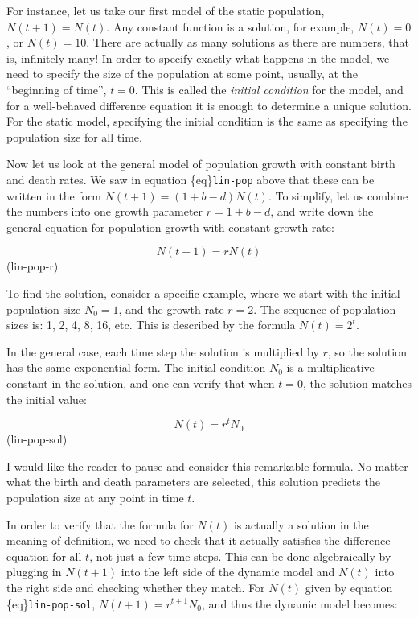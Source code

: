 \documentclass[
  letterpaper,
  DIV=11,
  numbers=noendperiod]{scrreprt}
\begin{document}
For instance, let us take our first model of the static population,
\(N(t+1) = N(t)\). Any constant function is a solution, for example,
\(N(t) = 0\), or \(N(t) = 10\). There are actually as many solutions as
there are numbers, that is, infinitely many! In order to specify exactly
what happens in the model, we need to specify the size of the population
at some point, usually, at the ``beginning of time'', \(t = 0\). This is
called the \emph{initial condition} for the model, and for a
well-behaved difference equation it is enough to determine a unique
solution. For the static model, specifying the initial condition is the
same as specifying the population size for all time.

Now let us look at the general model of population growth with constant
birth and death rates. We saw in equation \{eq\}\texttt{lin-pop} above
that these can be written in the form \(N(t+1) = (1 + b - d) N(t)\). To
simplify, let us combine the numbers into one growth parameter
\(r = 1 + b - d\), and write down the general equation for population
growth with constant growth rate:

\[
N(t+1) =  rN(t)
\] (lin-pop-r)

To find the solution, consider a specific example, where we start with
the initial population size \(N_0 = 1\), and the growth rate \(r=2\).
The sequence of population sizes is: 1, 2, 4, 8, 16, etc. This is
described by the formula \(N(t) = 2^t\).

In the general case, each time step the solution is multiplied by \(r\),
so the solution has the same exponential form. The initial condition
\(N_0\) is a multiplicative constant in the solution, and one can verify
that when \(t=0\), the solution matches the initial value:

\[
N(t)  = r^t N_0
\] (lin-pop-sol)

I would like the reader to pause and consider this remarkable formula.
No matter what the birth and death parameters are selected, this
solution predicts the population size at any point in time \(t\).

In order to verify that the formula for \(N(t)\) is actually a solution
in the meaning of definition, we need to check that it actually
satisfies the difference equation for all \(t\), not just a few time
steps. This can be done algebraically by plugging in \(N(t+1)\) into the
left side of the dynamic model and \(N(t)\) into the right side and
checking whether they match. For \(N(t)\) given by equation
\{eq\}\texttt{lin-pop-sol}, \(N(t+1) = r^{t+1} N_0\), and thus the
dynamic model becomes:
\end{document}
